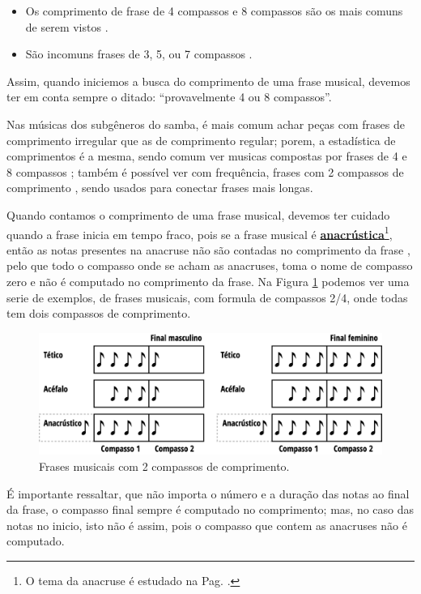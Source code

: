 \begin{itemize}
\item Os comprimento de frase de 4 compassos  e 8 compassos 
são os mais comuns de serem vistos
\cite[pp. 624]{latham2008diccionario} \cite[pp. 335]{medteoria} \cite[pp. 34]{bennett1993elementos} %
\cite[pp. 335]{medteoria} \cite[pp. 34]{bennett1993elementos}. %
\item São incomuns frases de 3, 5, ou 7 compassos \cite[pp. 34]{bennett1993elementos}.
\end{itemize}
Assim, quando iniciemos a busca do comprimento de uma frase musical,
devemos ter em conta sempre o ditado: ``provavelmente 4 ou 8 compassos''.


Nas músicas dos subgêneros do samba, 
é mais comum achar peças com frases de comprimento irregular que as de comprimento regular;
porem, a estadística de comprimentos é a mesma,
sendo comum ver musicas compostas por frases de 4 e 8 compassos 
\cite[pp. 624]{latham2008diccionario} \cite[pp. 335]{medteoria} \cite[pp. 34]{bennett1993elementos} %
\cite[pp. 335]{medteoria} \cite[pp. 34]{bennett1993elementos}; %
também é possível ver com frequência, frases com 2 compassos de comprimento 
\cite[pp. 34]{bennett1993elementos},%
sendo usados para conectar frases mais longas.



Quando contamos o comprimento de uma frase musical, 
devemos ter cuidado quando a frase inicia em tempo fraco,
pois se a frase musical é \hyperref[subsub:anacrustica]{\textbf{anacrústica}}\footnote{O 
tema da anacruse é estudado na Pag. \pageref{subsub:anacrustica}.},
então as notas presentes na anacruse não são contadas no comprimento da frase
\cite[pp. 148,150]{medteoria}, pelo que todo o compasso onde se acham as anacruses,
toma o nome de compasso zero e não é computado no comprimento da frase.
Na Figura \ref{fig:contagemtemposfrase} podemos ver uma serie de exemplos, 
de frases musicais, com formula de compassos 2/4, onde todas tem dois compassos de comprimento.
\begin{figure}[!h]
    \centering
    \includegraphics[width=\textwidth]{chapters/cap-musicalidade/contagemcompassosfrase.eps}
    \caption{Frases musicais com 2 compassos de comprimento.}
    \label{fig:contagemtemposfrase}
\end{figure}
É importante ressaltar, que não importa o número e a duração das notas ao final da frase,
o compasso final sempre é computado no comprimento;
mas, no caso das notas no inicio, isto não é assim,
pois o compasso que contem as anacruses não é computado.



